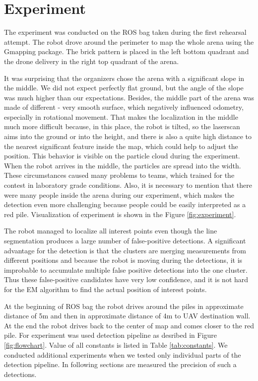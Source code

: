\chapter{Experiment}

The experiment was conducted on the ROS bag taken during the first rehearsal attempt. The robot drove around the perimeter to map the whole arena using the Gmapping package. The brick pattern is placed in the left bottom quadrant and the drone delivery in the right top quadrant of the arena.

 It was surprising that the organizers chose the arena with a significant slope in the middle. We did not expect perfectly flat ground, but the angle of the slope was much higher than our expectations. Besides, the middle part of the arena was made of different - very smooth surface, which negatively influenced odometry, especially in rotational movement. That makes the localization in the middle much more difficult because, in this place, the robot is tilted, so the laserscan aims into the ground or into the height, and there is also a quite high distance to the nearest significant feature inside the map, which could help to adjust the position. This behavior is visible on the particle cloud during the experiment. When the robot arrives in the middle, the particles are spread into the width. These circumstances caused many problems to teams, which trained for the contest in laboratory grade conditions. Also, it is necessary to mention that there were many people inside the arena during our experiment, which makes the detection even more challenging because people could be easily interpreted as a red pile. Visualization of experiment is shown in the Figure \ref{fig:experiment}.

The robot managed to localize all interest points even though the line segmentation produces a large number of false-positive detections. A significant advantage for the detection is that the clusters are merging measurements from different positions and because the robot is moving during the detections, it is improbable to accumulate multiple false positive detections into the one cluster. Thus these false-positive candidates have very low confidence, and it is not hard for the EM algorithm to find the actual position of interest points. 

At the beginning of ROS bag the robot drives around the piles in approximate distance of 5m and then in approximate distance of 4m to UAV destination wall. At the end the robot drives back to the center of map and comes closer to the red pile. For experiment was used detection pipeline as desribed in Figure \ref{fig:flowchart}. Value of all constants is listed in Table \ref{tab:constants}. We conducted additional experiments when we tested only individual parts of the detection pipeline. In following sections are measured the precision of such a detections.


